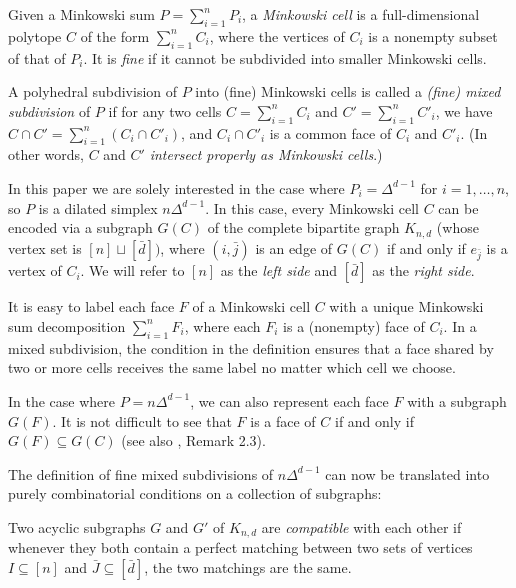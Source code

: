\documentclass[letterpaper,reqno,11pt]{amsart}
\begin{document}
\begin{definition}
    Given a Minkowski sum $P = \sum_{i=1}^n P_i$, a \emph{Minkowski cell} is a full-dimensional polytope $C$ of the form $\sum_{i=1}^n C_i$, where the vertices of $C_i$ is a nonempty subset of that of $P_i$. It is \emph{fine} if it cannot be subdivided into smaller Minkowski cells.

    A polyhedral subdivision of $P$ into (fine) Minkowski cells is called a \emph{(fine) mixed subdivision} of $P$ if for any two cells $C = \sum_{i=1}^n C_i$ and $C' = \sum_{i=1}^n C'_i$, we have $C \cap C' = \sum_{i=1}^n (C_i \cap C'_i)$, and $C_i \cap C'_i$ is a common face of $C_i$ and $C'_i$. (In other words, $C$ and $C'$ \emph{intersect properly as Minkowski cells}.)
\end{definition}

In this paper we are solely interested in the case where $P_i = \Delta^{d-1}$ for $i = 1, \dots, n$, so $P$ is a dilated simplex $n\Delta^{d-1}$. In this case, every Minkowski cell $C$ can be encoded via a subgraph $G(C)$ of the complete bipartite graph $K_{n, d}$ (whose vertex set is $[n] \sqcup [\bar{d}])$, where $(i, \bar{j})$ is an edge of $G(C)$ if and only if $e_{\bar{j}}$ is a vertex of $C_i$. We will refer to $[n]$ as the \emph{left side} and $[\bar{d}]$ as the \emph{right side}. 

\begin{remark}
    It is easy to label each face $F$ of a Minkowski cell $C$ with a unique Minkowski sum decomposition $\sum_{i=1}^n F_i$, where each $F_i$ is a (nonempty) face of $C_i$. In a mixed subdivision, the condition in the definition ensures that a face shared by two or more cells receives the same label no matter which cell we choose.

    In the case where $P = n\Delta^{d-1}$, we can also represent each face $F$ with a subgraph $G(F)$. It is not difficult to see that $F$ is a face of $C$ if and only if $G(F)\subseteq G(C)$ (see also \cite{TriangulationTOM}, Remark 2.3).
\end{remark}

The definition of fine mixed subdivisions of $n\Delta^{d-1}$ can now be translated into purely combinatorial conditions on a collection of subgraphs:

\begin{definition}
    Two acyclic subgraphs $G$ and $G'$ of $K_{n, d}$ are \emph{compatible} with each other if whenever they both contain a perfect matching between two sets of vertices $I\subseteq [n]$ and $\bar{J}\subseteq [\bar{d}]$, the two matchings are the same.
\end{definition}
\end{document}
